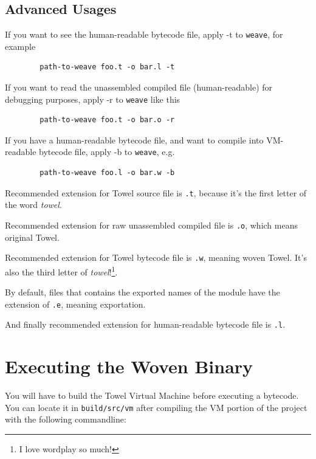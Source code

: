 \documentclass{report}
\begin{document}
\subsection{Advanced Usages}

If you want to see the human-readable bytecode file, apply -t to \texttt{weave}, for example

\begin{verbatim}
        path-to-weave foo.t -o bar.l -t
\end{verbatim}

If you want to read the unassembled compiled file (human-readable) for debugging purposes, apply -r to \texttt{weave} like this

\begin{verbatim}
        path-to-weave foo.t -o bar.o -r
\end{verbatim}

If you have a human-readable bytecode file, and want to compile into VM-readable bytecode file, apply -b to \texttt{weave}, e.g.

\begin{verbatim}
        path-to-weave foo.l -o bar.w -b
\end{verbatim}

\begin{mdframed}[style=hint]
  Recommended extension for Towel source file is \texttt{.t}, because it's the first letter of the word \textit{towel}.

  Recommended extension for raw unassembled compiled file is \texttt{.o}, which means original Towel.

  Recommended extension for Towel bytecode file is \texttt{.w}, meaning woven Towel. It's also the third letter of \textit{towel}!\footnote{I love wordplay so much!}.

  By default, files that contains the exported names of the module have the extension of \texttt{.e}, meaning exportation.

  And finally recommended extension for human-readable bytecode file is \texttt{.l}.
\end{mdframed}

\section{Executing the Woven Binary}

You will have to build the Towel Virtual Machine before executing a bytecode. You can locate it in \texttt{build/src/vm} after compiling the VM portion of the project with the following commandline:
\end{document}
